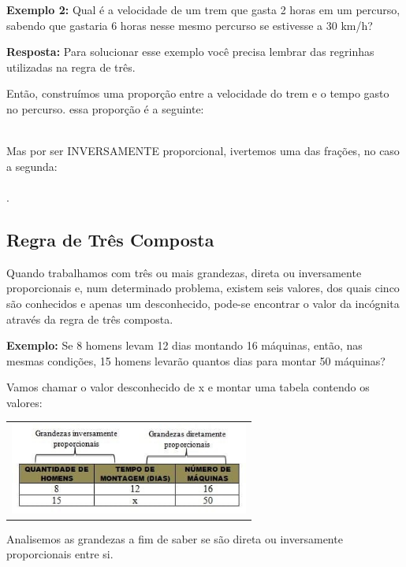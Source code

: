 \begin{multicols*}{2}
\textbf{Exemplo 2:} Qual é a velocidade de um trem que gasta 2 horas em um percurso, sabendo que gastaria 6 horas nesse mesmo percurso se estivesse a 30 km/h?

\textbf{Resposta:} Para solucionar esse exemplo você precisa lembrar das regrinhas utilizadas na regra de três.

Então, construímos uma proporção entre a velocidade do trem e o tempo gasto no percurso. essa proporção é a seguinte:

\\

	Mas por ser INVERSAMENTE proporcional, ivertemos uma das frações, no caso a segunda:\\
	
\\

.

\subsection{Regra de Três Composta}

Quando trabalhamos com três ou mais grandezas, direta ou inversamente proporcionais e, num determinado problema, existem seis valores, dos quais cinco são conhecidos e apenas um desconhecido, pode-se encontrar o valor da incógnita através da regra de três composta.

\textbf{Exemplo:} Se 8 homens levam 12 dias montando 16 máquinas, então, nas mesmas condições, 15 homens levarão quantos dias para montar 50 máquinas?

			Vamos chamar o valor desconhecido de x e montar uma tabela contendo os valores:

        	\begin{tabular}{@{}c@{}}
      		\includegraphics[height=30mm]{assets/R3composta.jpg}
    		\end{tabular}

Analisemos as grandezas a fim de saber se são direta ou inversamente proporcionais entre si.


\end{multicols*}
